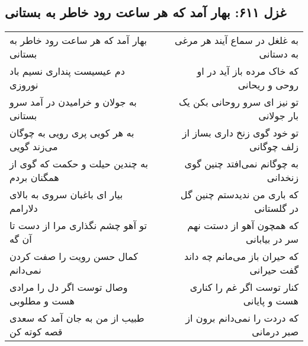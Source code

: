 \begin{center}
\section*{غزل ۶۱۱: بهار آمد که هر ساعت رود خاطر به بستانی}
\label{sec:611}
\begin{longtable}{l p{0.5cm} r}
بهار آمد که هر ساعت رود خاطر به بستانی
&&
به غلغل در سماع آیند هر مرغی به دستانی
\\
دم عیسیست پنداری نسیم باد نوروزی
&&
که خاک مرده باز آید در او روحی و ریحانی
\\
به جولان و خرامیدن در آمد سرو بستانی
&&
تو نیز ای سرو روحانی بکن یک بار جولانی
\\
به هر کویی پری رویی به چوگان می‌زند گویی
&&
تو خود گوی زنخ داری بساز از زلف چوگانی
\\
به چندین حیلت و حکمت که گوی از همگنان بردم
&&
به چوگانم نمی‌افتد چنین گوی زنخدانی
\\
بیار ای باغبان سروی به بالای دلارامم
&&
که باری من ندیدستم چنین گل در گلستانی
\\
تو آهو چشم نگذاری مرا از دست تا آن گه
&&
که همچون آهو از دستت نهم سر در بیابانی
\\
کمال حسن رویت را صفت کردن نمی‌دانم
&&
که حیران باز می‌مانم چه داند گفت حیرانی
\\
وصال توست اگر دل را مرادی هست و مطلوبی
&&
کنار توست اگر غم را کناری هست و پایانی
\\
طبیب از من به جان آمد که سعدی قصه کوته کن
&&
که دردت را نمی‌دانم برون از صبر درمانی
\\
\end{longtable}
\end{center}
